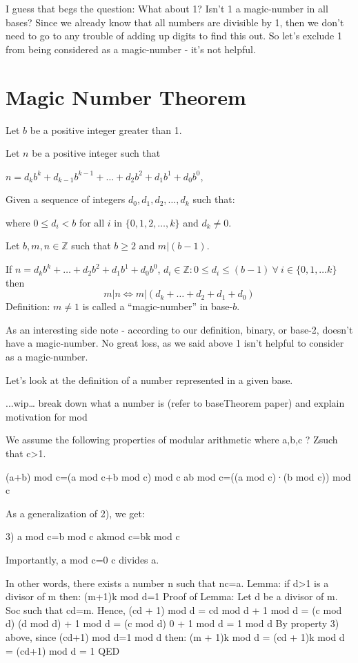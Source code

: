 \documentclass{article}
\newenvironment{jprIn}{\begin{adjustwidth}{2em}{}}{\end{adjustwidth}}
\begin{document}
I guess that begs the question: What about 1? Isn't 1 a magic-number in all bases?
Since we already know that all numbers are divisible by 1,
then we don't need to go to any trouble of adding up digits to find this out.
So let's exclude 1 from being considered as a magic-number - it's not helpful.

\section*{Magic Number Theorem}
\begin{jprIn}
Let $b$ be a positive integer greater than 1.

Let $n$ be a positive integer such that 

\hspace{3em}$n=d_kb^k+d_{k-1}b^{k-1}+\dots+d_2b^2+d_1b^1+d_0b^0$,

Given a sequence
of integers $d_0, d_1, d_2,\dots{},d_k$ such that:



where $0\le{}d_i<b$ for all $i$ in $\{0,1,2,\dots{},k\}$ and $d_k\ne0$.


Let $b, m, n\in\mathbb{Z}$ such that $b\ge2$ and $m\big|(b-1)$.

If $n=d_kb^k+\dots+d_2b^2+d_1b^1+d_0b^0$, $d_i\in\mathbb{Z}: 0\le{}d_i\le(b-1)\ \forall{}\ i\in\{0,1,\dots{}k\}$ then
\[m\big|n \Leftrightarrow m\big|(d_k+\dots+d_2+d_1+d_0)\]
Definition: $m\ne1$ is called a ``magic-number'' in base-$b$.
\end{jprIn}
\bigskip

As an interesting side note - according to our definition, binary,
or base-2, doesn't have a magic-number.
No great loss, as we said above 1 isn't helpful to consider as a magic-number. 

Let's look at the definition of a number represented in a given base.

...wip…
break down what a number is (refer to baseTheorem paper) and explain motivation for mod

We assume the following properties of modular arithmetic where a,b,c ? Zsuch that c>1.

(a+b) mod c=(a mod c+b mod c) mod c
ab mod c=((a mod c)·(b mod c)) mod c

As a generalization of 2), we get:

3) a mod c=b mod c akmod c=bk mod c

Importantly, a mod c=0 c divides a.

In other words, there exists a number n such that nc=a.
Lemma:
if d>1 is a divisor of m then:
(m+1)k mod d=1
Proof of Lemma:
Let d be a divisor of m. Soc such that cd=m.
Hence, (cd + 1) mod d = cd mod d + 1 mod d
= (c mod d) (d mod d) + 1 mod d
= (c mod d) 0 + 1 mod d
= 1 mod d
By property 3) above, since (cd+1) mod d=1 mod d then:
(m + 1)k mod d
= (cd + 1)k mod d
= (cd+1) mod d
= 1
QED
\end{document}
